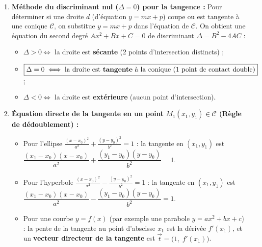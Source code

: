 \begin{theoreme}[Condition de tangence droite--conique ($\Delta = 0$) et vecteur tangent]
\begin{enumerate}
    \item \textbf{Méthode du discriminant nul ($\Delta = 0$) pour la tangence :} Pour déterminer si une droite $d$ (d'équation $y = mx + p$) coupe ou est tangente à une conique $\mathcal{C}$, on substitue $y = mx + p$ dans l'équation de $\mathcal{C}$. On obtient une équation du second degré $Ax^2 + Bx + C = 0$ de discriminant $\Delta = B^2 - 4AC$ :
    \begin{itemize}
        \item $\Delta > 0 \iff$ la droite est \textbf{sécante} (2 points d'intersection distincts) ;
        \item $\boxed{\Delta = 0 \iff \text{la droite est \textbf{tangente} à la conique (1 point de contact double)}}$ ;
        \item $\Delta < 0 \iff$ la droite est \textbf{extérieure} (aucun point d'intersection).
    \end{itemize}
    \item \textbf{Équation directe de la tangente en un point $M_1(x_1, y_1) \in \mathcal{C}$ (Règle de dédoublement) :}
    \begin{itemize}
        \item Pour l'ellipse $\frac{(x-x_0)^2}{a^2} + \frac{(y-y_0)^2}{b^2} = 1$ : la tangente en $(x_1, y_1)$ est $\dfrac{(x_1-x_0)(x-x_0)}{a^2} + \dfrac{(y_1-y_0)(y-y_0)}{b^2} = 1$.
        \item Pour l'hyperbole $\frac{(x-x_0)^2}{a^2} - \frac{(y-y_0)^2}{b^2} = 1$ : la tangente en $(x_1, y_1)$ est $\dfrac{(x_1-x_0)(x-x_0)}{a^2} - \dfrac{(y_1-y_0)(y-y_0)}{b^2} = 1$.
        \item Pour une courbe $y = f(x)$ (par exemple une parabole $y = ax^2 + bx + c$) : la pente de la tangente au point d'abscisse $x_1$ est la dérivée $f'(x_1)$, et un \textbf{vecteur directeur de la tangente} est $\boxed{\vec{t} = \bigl(1,\; f'(x_1)\bigr)}$.
    \end{itemize}
\end{enumerate}
\end{theoreme}

